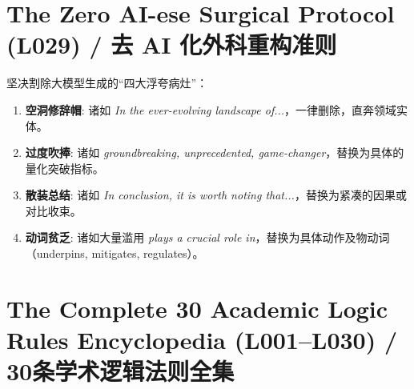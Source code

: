 \section{The Zero AI-ese Surgical Protocol (L029) / 去 AI 化外科重构准则}
坚决割除大模型生成的“四大浮夸病灶”：
\begin{enumerate}[label=\textbf{\color{TargetHighlight}Symptom \arabic*:}, leftmargin=2em]
  \item \textbf{空洞修辞帽}: 诸如 \textit{In the ever-evolving landscape of...}，一律删除，直奔领域实体。
  \item \textbf{过度吹捧}: 诸如 \textit{groundbreaking, unprecedented, game-changer}，替换为具体的量化突破指标。
  \item \textbf{散装总结}: 诸如 \textit{In conclusion, it is worth noting that...}，替换为紧凑的因果或对比收束。
  \item \textbf{动词贫乏}: 诸如大量滥用 \textit{plays a crucial role in}，替换为具体动作及物动词（underpins, mitigates, regulates）。
\end{enumerate}

\section{The Complete 30 Academic Logic Rules Encyclopedia (L001--L030) / 30条学术逻辑法则全集}
